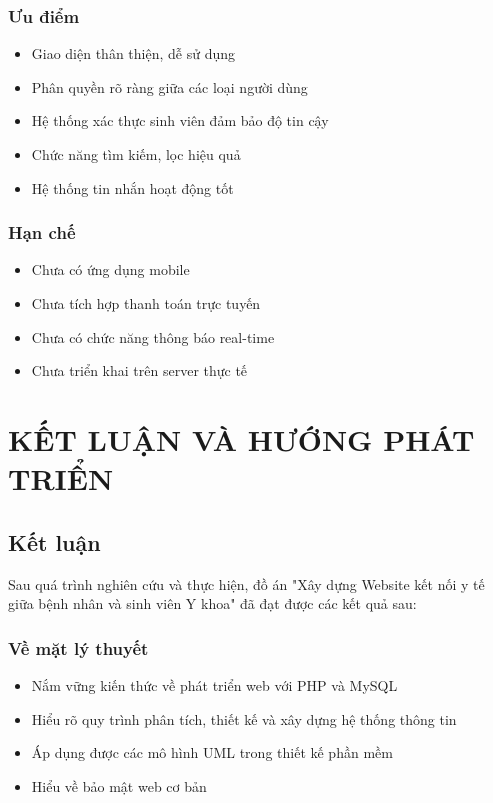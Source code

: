 \documentclass[a4paper,12pt]{report}
\begin{document}
\subsection{Ưu điểm}
\begin{itemize}
    \item Giao diện thân thiện, dễ sử dụng
    \item Phân quyền rõ ràng giữa các loại người dùng
    \item Hệ thống xác thực sinh viên đảm bảo độ tin cậy
    \item Chức năng tìm kiếm, lọc hiệu quả
    \item Hệ thống tin nhắn hoạt động tốt
\end{itemize}

\subsection{Hạn chế}
\begin{itemize}
    \item Chưa có ứng dụng mobile
    \item Chưa tích hợp thanh toán trực tuyến
    \item Chưa có chức năng thông báo real-time
    \item Chưa triển khai trên server thực tế
\end{itemize}

\chapter{KẾT LUẬN VÀ HƯỚNG PHÁT TRIỂN}

\section{Kết luận}

Sau quá trình nghiên cứu và thực hiện, đồ án "Xây dựng Website kết nối y tế giữa bệnh nhân và sinh viên Y khoa" đã đạt được các kết quả sau:

\subsection{Về mặt lý thuyết}
\begin{itemize}
    \item Nắm vững kiến thức về phát triển web với PHP và MySQL
    \item Hiểu rõ quy trình phân tích, thiết kế và xây dựng hệ thống thông tin
    \item Áp dụng được các mô hình UML trong thiết kế phần mềm
    \item Hiểu về bảo mật web cơ bản
\end{itemize}
\end{document}
